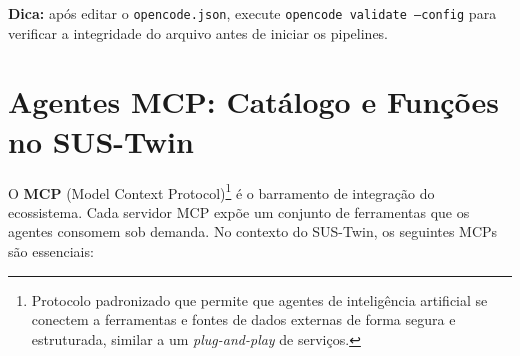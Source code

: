 \begin{highlight}
\textbf{Dica:} após editar o \texttt{opencode.json}, execute
\texttt{opencode validate --config} para verificar a integridade do arquivo
antes de iniciar os pipelines.
\end{highlight}


\section{Agentes MCP: Catálogo e Funções no SUS-Twin}
\label{sec:opencode-mcp}

O \textbf{MCP} (Model Context Protocol)\footnote{Protocolo padronizado que
permite que agentes de inteligência artificial se conectem a ferramentas e
fontes de dados externas de forma segura e estruturada, similar a um
\textit{plug-and-play} de serviços.} é o barramento de integração do
ecossistema. Cada servidor MCP expõe um conjunto de ferramentas que os agentes
consomem sob demanda. No contexto do SUS-Twin, os seguintes MCPs são
essenciais:

